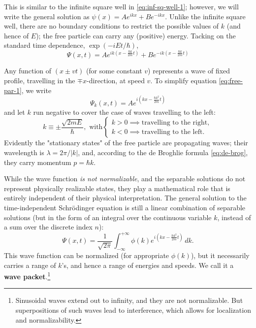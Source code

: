 \documentclass{article}
\begin{document}
This is similar to the infinite square well in \eqref{eq:inf-sq-well-1};
however, we will write the general solution as $\psi(x) = Ae^{ikx} +
Be^{-ikx}$. Unlike the infinite square well, there are no boundary conditions
to restrict the possible values of $k$ (and hence of $E$); the free particle
can carry any (positive) energy. Tacking on the standard time dependence,
$\exp(-iEt/\hbar)$,
\begin{equation} \label{eq:free-par-1}
  \Psi(x, t)
  = Ae^{ik(x - \frac{\hbar k}{2m}t)} + Be^{-ik(x - \frac{\hbar k}{2m}t)}
\end{equation}

Any function of $(x \pm vt)$ (for some constant $v$) represents a wave of fixed
profile, travelling in the $\mp x$-direction, at speed $v$. To simplify
equation \eqref{eq:free-par-1}, we write
\begin{equation} \label{eq:free-par-2}
  \Psi_k(x, t) = Ae^{i(kx - \frac{\hbar k^2}{2m}t)}
\end{equation}
and let $k$ run negative to cover the case of waves travelling to the left:
\begin{equation} \label{eq:free-par-k}
  k \equiv \pm\frac{\sqrt{2mE}}{\hbar},
  \text{ with}
  \begin{cases}
    k > 0 \implies \text{travelling to the right}, \\
    k < 0 \implies \text{travelling to the left}.
  \end{cases}
\end{equation}
Evidently the "stationary states" of the free particle are propagating waves;
their wavelength is $\lambda = 2\pi/|k|$, and, according to the de Broghlie
formula \eqref{eq:de-brog}, they carry momentum $p = \hbar k$.

While the wave function \emph{is not normalizable}, and the separable solutions
do not represent physically realizable states, they play a mathematical role
that is entirely independent of their physical interpretation. The general
solution to the time-independent Schr\"{o}dinger equation is still a linear
combination of separable solutions (but in the form of an integral over the
continuous variable $k$, instead of a sum over the discrete index $n$):
\begin{equation} \label{eq:free-par-psi}
  \boxed{
    \Psi(x, t)
    = \frac{1}{\sqrt{2\pi}}\int_{-\infty}^{+\infty}
      \phi(k)e^{i(kx - \frac{\hbar k^2}{2m}t)}
    \,dk.
  }
\end{equation}
This wave function can be normalized (for appropriate $\phi(k)$), but it
necessarily carries a range of $k$'s, and hence a range of energies and speeds.
We call it a \textbf{wave packet}.\footnote{Sinusoidal waves extend out to
infinity, and they are not normalizable. But superpositions of such waves lead
to interference, which allows for localization and normalizability.}
\end{document}
